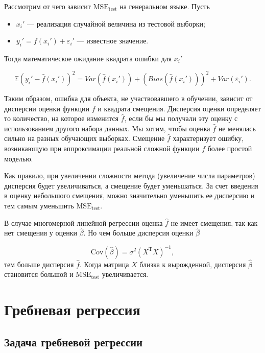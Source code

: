 \documentclass[specialist,
               subf,href,colorlinks=true, 12pt,a4paper]{article} %
\newcommand{\E}{\mathbb{E}}
\newcommand{\T}{\mathrm{T}}
\numberwithin{equation}{section}
\begin{document}
Рассмотрим от чего зависит $\mathrm{MSE}_{\mathrm{test}}$ на генеральном языке. Пусть
\begin{itemize}
\item $x_i'$ --- реализация случайной величина из тестовой выборки;
\item $y_i' = f(x_i') + \varepsilon_i'$ --- известное значение.
\end{itemize}
Тогда математическое ожидание квадрата ошибки для $x_i'$

\begin{equation*}
\E(y_i' - \hat{f}(x_i'))^2 = Var(\hat{f}(x_i')) + (Bias(\hat{f}(x_i')))^2 + Var(\varepsilon_i').
\end{equation*}

Таким образом, ошибка для объекта, не участвовавшего в обучении, зависит от дисперсии оценки функции $f$ и квадрата смещения. Дисперсия оценки определяет то количество, на которое изменится $\hat{f}$, если бы мы получали эту оценку с использованием другого набора данных. Мы хотим, чтобы оценка $\hat{f}$ не менялась сильно на разных обучающих выборках. Смещение $\hat{f}$ характеризует ошибку, возникающую при аппроксимации реальной сложной функции $f$ более простой моделью.

Как правило, при увеличении сложности метода (увеличение числа параметров) дисперсия будет увеличиваться, а смещение будет уменьшаться. За счет введения в оценку небольшого смещения, можно значительно уменьшить ее дисперсию и тем самым уменьшить $\mathrm{MSE}_{\mathrm{test}}$.

В случае многомерной линейной регрессии оценка $\hat{f}$ не имеет смещения, так как нет смещения у оценки $\hat{\beta}$. Но чем больше дисперсия оценки $\hat{\beta}$ 

\begin{equation*}
\mathrm{Cov}(\hat{\beta}) = \sigma^2(X^{\T}X)^{-1},
\end{equation*}
тем больше дисперсия $\hat{f}$. Когда матрица $X$ близка к вырожденной, дисперсия $\hat{\beta}$ становится большой и $\mathrm{MSE}_{\mathrm{test}}$ увеличивается.


\section{Гребневая регрессия}

\subsection{Задача гребневой регрессии}
\end{document}
